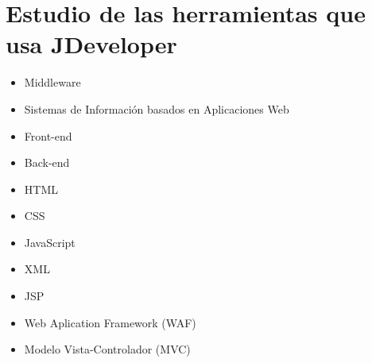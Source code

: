 \section{Estudio de las herramientas que usa JDeveloper}

\begin{itemize}
	\item Middleware
	\item Sistemas de Información basados en Aplicaciones Web
	\item Front-end
	\item Back-end
	\item HTML
	\item CSS
	\item JavaScript
	\item XML
	\item JSP
	\item Web Aplication Framework (WAF)
	\item Modelo Vista-Controlador (MVC)
\end{itemize}
